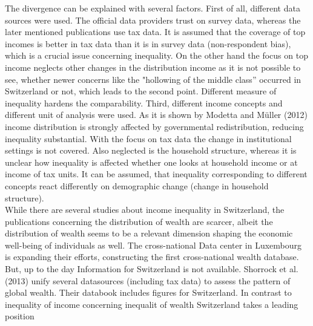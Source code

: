 \documentclass[twoside]{article}\usepackage[]{graphicx}\usepackage[]{color}
\begin{document}
\begin{multicols}{2}

The divergence can be explained with several factors. First of all, different data sources were used. The official data providers trust on survey data, whereas the later mentioned publications use tax data. It is assumed that the coverage of top incomes is better in tax data than it is in survey data (non-respondent bias), which is a crucial issue concerning inequality. On the other hand the focus on top income neglects other changes in the distribution income as it is not possible to see, whether newer concerns like the "hollowing of the middle class'' occurred in Switzerland or not, which leads to the second point. Different measure of inequality hardens the comparability. Third, different income concepts and different unit of analysis were used. As it is shown by Modetta and Müller (2012) income distribution is strongly affected by governmental redistribution, reducing inequality substantial. With the focus on tax data the change in institutional settings is not covered. Also neglected is the household structure, whereas it is unclear how inequality is affected whether one looks at household income or at income of tax units. It can be assumed, that inequality corresponding to different concepts react differently on demographic change (change in household structure). \\


While there are several studies about income inequality in Switzerland, the publications concerning the distribution of wealth are scarcer, albeit the distribution of wealth seems to be a relevant dimension shaping the economic well-being of individuals as well. The cross-national Data center in Luxembourg is expanding their efforts, constructing the first cross-national wealth database. But, up to the day Information for Switzerland is not available. Shorrock et al. (2013) unify several datasources (including tax data) to assess the pattern of global wealth. Their databook includes figures for Switzerland. In contrast to inequality of income concerning inequalit of wealth Switzerland takes a leading position \\



\end{multicols}
\end{document}
